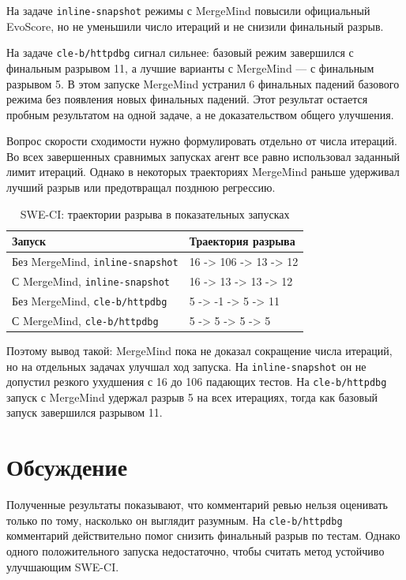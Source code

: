 \documentclass[12pt,a4paper]{article}
\begin{document}
На задаче \texttt{inline-snapshot} режимы с MergeMind повысили официальный
EvoScore, но не уменьшили число итераций и не снизили финальный разрыв.

На задаче \texttt{cle-b/httpdbg} сигнал сильнее: базовый режим завершился с
финальным разрывом 11, а лучшие варианты с MergeMind --- с финальным разрывом
5. В этом запуске MergeMind устранил 6 финальных падений базового режима без
появления новых финальных падений. Этот результат остается пробным результатом
на одной задаче, а не доказательством общего улучшения.

Вопрос скорости сходимости нужно формулировать отдельно от числа итераций. Во
всех завершенных сравнимых запусках агент все равно использовал заданный лимит
итераций. Однако в некоторых траекториях MergeMind раньше удерживал лучший
разрыв или предотвращал позднюю регрессию.

\begin{table}[h]
\centering
\small
\caption{SWE-CI: траектории разрыва в показательных запусках}
\begin{tabularx}{\textwidth}{YY}
  \toprule
  Запуск & Траектория разрыва \\
  \midrule
  Без MergeMind, \texttt{inline-snapshot} & 16 -> 106 -> 13 -> 12 \\
  С MergeMind, \texttt{inline-snapshot} & 16 -> 13 -> 13 -> 12 \\
  Без MergeMind, \texttt{cle-b/httpdbg} & 5 -> -1 -> 5 -> 11 \\
  С MergeMind, \texttt{cle-b/httpdbg} & 5 -> 5 -> 5 -> 5 \\
  \bottomrule
\end{tabularx}
\end{table}

Поэтому вывод такой: MergeMind пока не доказал сокращение числа
итераций, но на отдельных задачах улучшал ход запуска. На
\texttt{inline-snapshot} он не допустил резкого ухудшения с 16 до 106 падающих
тестов. На \texttt{cle-b/httpdbg} запуск с MergeMind удержал разрыв 5 на всех
итерациях, тогда как базовый запуск завершился разрывом 11.

\section{Обсуждение}

Полученные результаты показывают, что комментарий ревью нельзя оценивать
только по тому, насколько он выглядит разумным. На \texttt{cle-b/httpdbg}
комментарий действительно помог снизить финальный разрыв по тестам. Однако
одного положительного запуска недостаточно, чтобы считать метод устойчиво
улучшающим SWE-CI.
\end{document}
